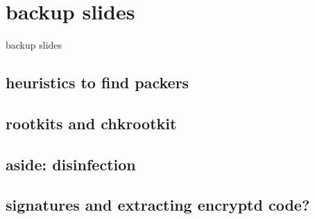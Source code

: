 \section{backup slides}
\begin{frame}{backup slides}
\end{frame}

\subsection{heuristics to find packers}


\subsection{rootkits and chkrootkit}


\subsection{aside: disinfection}


\subsection{signatures and extracting encryptd code?}

